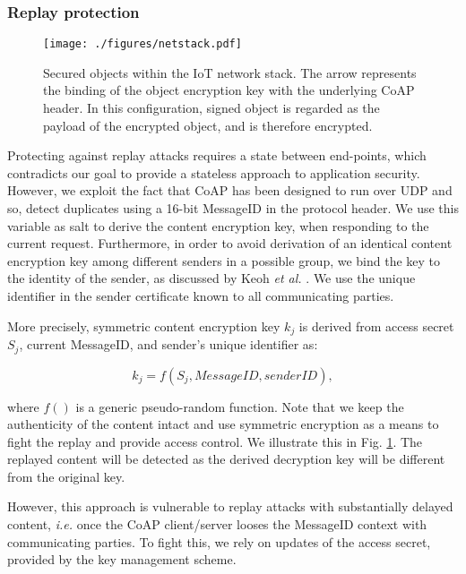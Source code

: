 \documentclass[conference]{IEEEtran}
\begin{document}
\subsubsection{Replay protection} 
\label{replay}

\begin{figure}[htbp]
\centering
\texttt{[image: ./figures/netstack.pdf]}
\caption{Secured objects within the IoT network stack. The arrow represents the binding
of the object encryption key with the underlying CoAP header. In this configuration, 
signed object is regarded as the payload of the encrypted object, and is therefore encrypted.}
\label{fig:netstack}
\end{figure}
Protecting against replay attacks requires a state between end-points, which
contradicts our goal to provide a stateless approach to application
security. However, we exploit the fact that CoAP has been designed to run over
UDP and so, detect duplicates using a 16-bit MessageID in the protocol
header. We use this variable as salt to derive the content encryption key, when
responding to the current request. Furthermore, in order to avoid derivation of an identical
content encryption key among different senders in a possible group, we bind the key to the identity of
the sender, as discussed by Keoh \emph{et al.} \cite{dtls-multicast-draft}. We use
the unique identifier in the sender certificate known to all communicating parties.


More precisely, symmetric content encryption key $k_j$ is derived from access
secret $S_j$, current MessageID, and sender's unique identifier as: 

\begin{equation}
k_j = f(S_j, MessageID, senderID),
\end{equation}

\noindent where $f()$ is a generic pseudo-random function. Note that we keep the
authenticity of the content intact and use symmetric encryption as a means to
fight the replay and provide access control. We illustrate this in Fig. \ref{fig:netstack}. 
The replayed content will be detected as the derived decryption key will be different from the original key.




However, this approach is vulnerable to replay attacks with substantially
delayed content, \emph{i.e.} once the CoAP client/server looses the MessageID context with communicating parties. To fight this, we rely on updates of the access secret, provided by the key management scheme.
\end{document}
